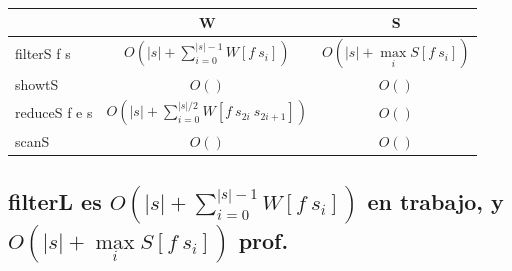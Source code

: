 \documentclass[12pt]{article}
\begin{document}
\begin{tabular}{@{}lcc@{}}
\toprule
        & W & S \\ 
\midrule
filterS f s & $O(|s| + \sum\limits_{i=0}^{|s|-1} W[f\ s_i])$  & $O(|s| + \max\limits_{i} S[f\ s_i] )$  \\
showtS  & $O()$  &  $O()$ \\
reduceS f e s & $O(|s| + \sum\limits_{i=0}^{|s|/2} W[f\ s_{2i}\ s_{2i+1}])$  &  $O()$ \\
scanS   & $O()$  &  $O()$ \\ 
\bottomrule
\end{tabular}


\subsection{filterL es $O(|s| + \sum\limits_{i=0}^{|s|-1} W[f\ s_i])$ en trabajo, y $O(|s| + \max\limits_{i} S[f\ s_i] )$ prof.}
\end{document}
